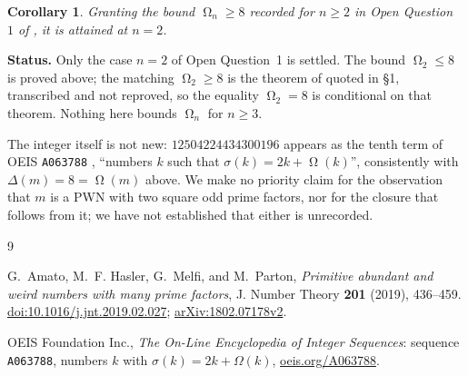 \documentclass[11pt]{amsart}
\newtheorem{corollary}[theorem]{Corollary}
\DeclareMathOperator{\Om}{\Omega}
\newcommand{\sig}{\sigma}
\begin{document}
\begin{corollary}
Granting the bound $\Om_n\ge8$ recorded for $n\ge2$ in Open Question~$1$ of
\cite{AHMP19}, it is attained at $n=2$.
\end{corollary}

\medskip
\noindent\textbf{Status.}
Only the case $n=2$ of Open Question~1 is settled. The bound $\Om_2\le8$ is
proved above; the matching $\Om_2\ge8$ is the theorem of \cite{AHMP19} quoted
in \S1, transcribed and not reproved, so the equality $\Om_2=8$ is conditional
on that theorem. Nothing here bounds $\Om_n$ for $n\ge3$.

The integer itself is not new: $12504224434300196$ appears as the tenth term
of OEIS \texttt{A063788} \cite{OEIS}, ``numbers $k$ such that
$\sig(k)=2k+\Om(k)$'', consistently with $\Delta(m)=8=\Om(m)$ above. We make
no priority claim for the observation that $m$ is a PWN with two square odd
prime factors, nor for the closure that follows from it; we have not
established that either is unrecorded.

\begin{thebibliography}{9}

G.~Amato, M.~F. Hasler, G.~Melfi, and M.~Parton,
\emph{Primitive abundant and weird numbers with many prime factors},
J. Number Theory \textbf{201} (2019), 436--459.
\href{https://doi.org/10.1016/j.jnt.2019.02.027}{doi:10.1016/j.jnt.2019.02.027};
\href{https://arxiv.org/abs/1802.07178v2}{arXiv:1802.07178v2}.

OEIS Foundation Inc., \emph{The On-Line Encyclopedia of Integer Sequences}:
sequence \texttt{A063788}, numbers $k$ with $\sigma(k)=2k+\Omega(k)$,
\href{https://oeis.org/A063788}{oeis.org/A063788}.

\end{thebibliography}
\end{document}

